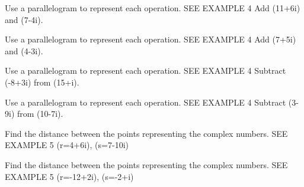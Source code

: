 \documentclass{article}
\newenvironment{practice}[2]{}{}        %
\newcommand{\answer}[1]{}               %
\newcommand{\placeholder}[2]{}          %
\begin{document}
\begin{practice}{24}{1}
Use a parallelogram to represent each operation. SEE EXAMPLE 4
Add (11+6i) and (7-4i).
\answer{See graph: (18+2i).}
\placeholder{graph}{Complex grid spacing 2 both axes, real [-2,20], imaginary [-10,10], double-arrowed R and i axes, O origin. Real labels 4,8,12,16, imaginary -8i,-4i,4i,8i. Solid red parallelogram with filled vertices O,(11,6),(18,2),(7,-4), labels 11+6i,18+2i,7-4i.}
\end{practice}
\begin{practice}{25}{1}
Use a parallelogram to represent each operation. SEE EXAMPLE 4
Add (7+5i) and (4-3i).
\answer{See graph: (11+2i).}
\placeholder{graph}{Unit complex grid real [-1,12], imaginary [-5,6], double-arrowed R and i axes, O origin. Real labels 2,4,6,8,10, imaginary -4i,-2i,2i,4i. Solid red parallelogram with filled vertices O,(7,5),(11,2),(4,-3); labels 7+5i,11+2i,4-3i.}
\end{practice}
\begin{practice}{26}{1}
Use a parallelogram to represent each operation. SEE EXAMPLE 4
Subtract (-8+3i) from (15+i).
\answer{See graph: (23-2i).}
\placeholder{graph}{Complex grid real spacing 2.5, imaginary spacing 1, real window [-5,25], imaginary [-5,5], double-arrowed R and i axes, O origin. Real labels 5,10,15,20, imaginary -4i,-2i,2i,4i. Solid red parallelogram with filled vertices O,(15,1),(23,-2),(8,-3); labels 15+i,23-2i,8-3i.}
\end{practice}
\begin{practice}{27}{1}
Use a parallelogram to represent each operation. SEE EXAMPLE 4
Subtract (3-9i) from (10-7i).
\answer{See graph: (7+2i).}
\placeholder{graph}{Complex grid spacing 2, real [-6,16], imaginary [-10,10], double-arrowed R and i axes, O origin. Real labels -4,4,8,12, imaginary -8i,-4i,4i,8i. Solid red parallelogram filled vertices O,(-3,9),(7,2),(10,-7); labels -3+9i,7+2i,10-7i.}
\end{practice}
\begin{practice}{28}{1}
Find the distance between the points representing the complex numbers. SEE EXAMPLE 5
(r=4+6i), (s=7-10i)
\answer{(\sqrt{265}\approx16.28)}
\end{practice}
\begin{practice}{29}{1}
Find the distance between the points representing the complex numbers. SEE EXAMPLE 5
(r=-12+2i), (s=-2+i)
\answer{(\sqrt{101}\approx10.05)}
\end{practice}
\end{document}
